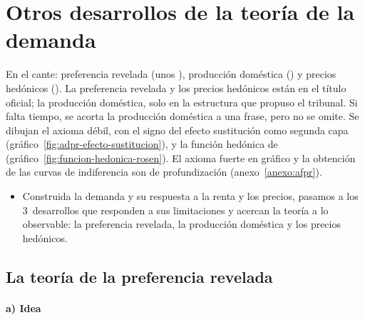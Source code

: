 \documentclass[11pt]{article}
\begin{document}
\section{Otros desarrollos de la teoría de la demanda}\label{sec:otros-desarrollos-teoria}

\begin{notaopositor}
En el cante: preferencia revelada (unos ), producción doméstica () y precios hedónicos (). La preferencia revelada y los precios hedónicos están en el título oficial; la producción doméstica, solo en la estructura que propuso el tribunal. Si falta tiempo, se acorta la producción doméstica a una frase, pero no se omite. Se dibujan el axioma débil, con el signo del efecto sustitución como segunda capa (gráfico~\ref{fig:adpr-efecto-sustitucion}), y la función hedónica de  (gráfico~\ref{fig:funcion-hedonica-rosen}). El axioma fuerte en gráfico y la obtención de las curvas de indiferencia son de profundización (anexo~\ref{anexo:afpr}).
\end{notaopositor}

\begin{itemize}
\item Construida la demanda y su respuesta a la renta y los precios, pasamos a los 3~desarrollos que responden a sus limitaciones y acercan la teoría a lo observable: la preferencia revelada, la producción doméstica y los precios hedónicos.
\end{itemize}

\subsection{La teoría de la preferencia revelada}\label{sec:teoria-preferencia-revelada}

\paragraph{a) Idea}
\end{document}
